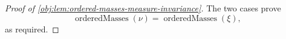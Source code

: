 \begin{proof}[Proof of \cref{obj:lem:ordered-masses-measure-invariance}]
The two cases prove
\[
\operatorname{orderedMasses}(\nu)=\operatorname{orderedMasses}(\xi),
\]
as required.
\end{proof}
